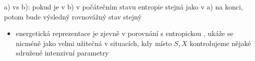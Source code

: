 
\textcolor{NavyBlue}{a) vs b): pokud je v b) v počátečním stavu entropie stejná jako v a) na konci, potom bude výsledný rovnovážný stav stejný}

\begin{itemize}
  \item energetická reprezentace je zjevně v porovnání s entropickou , ukáže se nicméně jako velmi užitečná v situacích, kdy místo $S, X$ kontrolujeme nějaké sdružené intenzivní parametry
\end{itemize}

